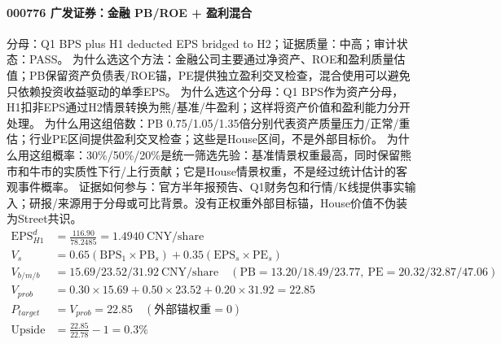 \paragraph{000776 广发证券：金融 PB/ROE + 盈利混合}
分母：Q1 BPS plus H1 deducted EPS bridged to H2；证据质量：中高；审计状态：PASS。
为什么选这个方法：金融公司主要通过净资产、ROE和盈利质量估值；PB保留资产负债表/ROE锚，PE提供独立盈利交叉检查，混合使用可以避免只依赖投资收益驱动的单季EPS。
为什么选这个分母：Q1 BPS作为资产分母，H1扣非EPS通过H2情景转换为熊/基准/牛盈利；这样将资产价值和盈利能力分开处理。
为什么用这组倍数：PB 0.75/1.05/1.35倍分别代表资产质量压力/正常/重估；行业PE区间提供盈利交叉检查；这些是House区间，不是外部目标价。
为什么用这组概率：30\%/50\%/20\%是统一筛选先验：基准情景权重最高，同时保留熊市和牛市的实质性下行/上行贡献；它是House情景权重，不是经过统计估计的客观事件概率。
证据如何参与：官方半年报预告、Q1财务包和行情/K线提供事实输入；研报/来源用于分母或可比背景。没有正权重外部目标锚，House价值不伪装为Street共识。
\begin{align*}
\mathrm{EPS}_{H1}^d &= \frac{116.90}{78.2485} = 1.4940\ \mathrm{CNY/share}\\
V_s &= 0.65\left(\mathrm{BPS}_1\times \mathrm{PB}_s\right)+0.35\left(\mathrm{EPS}_s\times \mathrm{PE}_s\right)\\
V_{b/m/b} &= 15.69/23.52/31.92\ \mathrm{CNY/share}\quad(\mathrm{PB}=13.20/18.49/23.77,\ \mathrm{PE}=20.32/32.87/47.06)\\
V_{prob} &= 0.30\times 15.69+0.50\times 23.52+0.20\times 31.92=22.85\\
P_{target} &= V_{prob}=22.85\quad(\text{外部锚权重}=0)\\
\mathrm{Upside} &= \frac{22.85}{22.78}-1=0.3\%\\
\end{align*}


